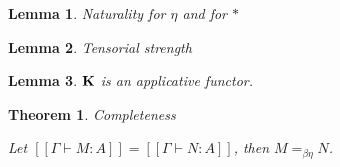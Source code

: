 \documentclass[a4paper]{article}
\newtheorem{theorem}{Theorem}
\newtheorem{lemma}{Lemma}
\begin{document}
\begin{lemma} Naturality for $\eta$ and for $\ast$
\end{lemma}

\begin{lemma} Tensorial strength
\end{lemma}

\begin{lemma}

  ${\bf K}$ is an applicative functor.
\end{lemma}

\begin{theorem} Completeness

  Let $[\![\Gamma \vdash M : A]\!] = [\![\Gamma \vdash N : A]\!]$, then $M =_{\beta \eta} N$.
\end{theorem}

\end{document}
